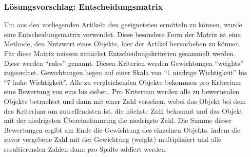 \subsubsection{Lösungsvorschlag: Entscheidungsmatrix}

Um aus den vorliegenden Artikeln den geeignetsten ermitteln zu können, wurde eine Entscheidungsmatrix verwendet. 
Diese besondere Form der Matrix ist eine Methode, den Nutzwert eines Objekts, hier der Artikel hervorheben zu können.
Für diese Matrix müssen zunächst Entscheidungskriterien gesammelt werden. 
Diese werden ``rules'' genannt. 
Diesen Kriterien werden Gewichtungen ``weights'' zugeordnet. 
Gewichtungen liegen auf einer Skala von ``1 niedrige Wichtigkeit'' bis ``7 hohe Wichtigkeit''. 
Alle zu vergleichenden Objekte bekommen pro Kriterium eine Bewertung von eins bis sieben. 
Pro Kriterium werden alle zu bewertenden Objekte betrachtet und dann mit einer Zahl versehen, wobei das Objekt bei dem das Kriterium am zutreffendsten ist, die höchste Zahl bekommt und das Objekt mit der niedrigsten Übereinstimmung die niedrigste Zahl. 
Die Summe dieser Bewertungen ergibt am Ende die Gewichtung des einzelnen Objekts, indem die zuvor vergebene Zahl mit der Gewichtung (weight) multipliziert und alle resultierenden Zahlen dann pro Spalte addiert werden. 



